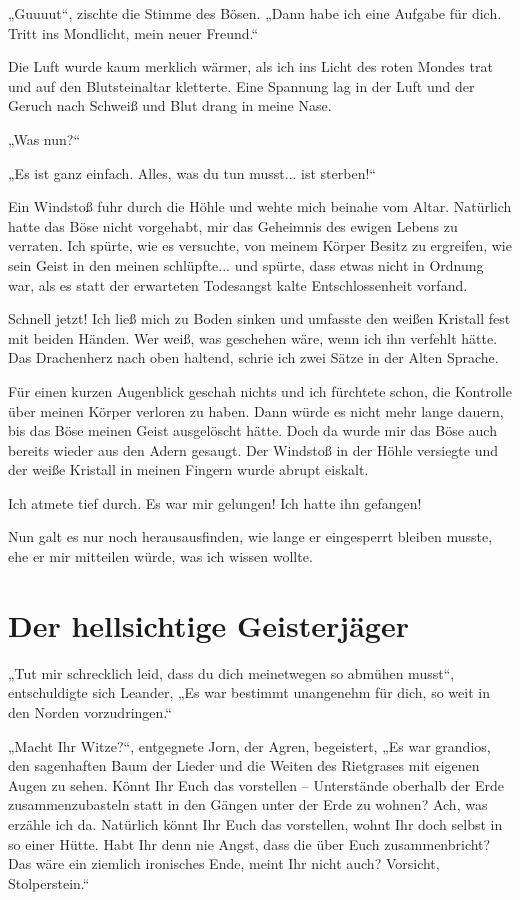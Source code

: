 „Guuuut“, zischte die Stimme des Bösen. „Dann habe ich eine Aufgabe für dich. Tritt ins Mondlicht, mein neuer Freund.“

Die Luft wurde kaum merklich wärmer, als ich ins Licht des roten Mondes trat und auf den Blutsteinaltar kletterte. Eine Spannung lag in der Luft und der Geruch nach Schweiß und Blut drang in meine Nase.

„Was nun?“

„Es ist ganz einfach. Alles, was du tun musst... ist sterben!“

Ein Windstoß fuhr durch die Höhle und wehte mich beinahe vom Altar. Natürlich hatte das Böse nicht vorgehabt, mir das Geheimnis des ewigen Lebens zu verraten. Ich spürte, wie es versuchte, von meinem Körper Besitz zu ergreifen, wie sein Geist in den meinen schlüpfte... und spürte, dass etwas nicht in Ordnung war, als es statt der erwarteten Todesangst kalte Entschlossenheit vorfand.

Schnell jetzt! Ich ließ mich zu Boden sinken und umfasste den weißen Kristall fest mit beiden Händen. Wer weiß, was geschehen wäre, wenn ich ihn verfehlt hätte. Das Drachenherz nach oben haltend, schrie ich zwei Sätze in der Alten Sprache.

Für einen kurzen Augenblick geschah nichts und ich fürchtete schon, die Kontrolle über meinen Körper verloren zu haben. Dann würde es nicht mehr lange dauern, bis das Böse meinen Geist ausgelöscht hätte. Doch da wurde mir das Böse auch bereits wieder aus den Adern gesaugt. Der Windstoß in der Höhle versiegte und der weiße Kristall in meinen Fingern wurde abrupt eiskalt.

Ich atmete tief durch. Es war mir gelungen! Ich hatte ihn gefangen!

Nun galt es nur noch herausausfinden, wie lange er eingesperrt bleiben musste, ehe er mir mitteilen würde, was ich wissen wollte.





\newpage
\section{Der hellsichtige Geisterjäger}

„Tut mir schrecklich leid, dass du dich meinetwegen so abmühen musst“, entschuldigte sich Leander, „Es war bestimmt unangenehm für dich, so weit in den Norden vorzudringen.“

„Macht Ihr Witze?“, entgegnete Jorn, der Agren, begeistert, „Es war grandios, den sagenhaften Baum der Lieder und die Weiten des Rietgrases mit eigenen Augen zu sehen. Könnt Ihr Euch das vorstellen – Unterstände oberhalb der Erde zusammenzubasteln statt in den Gängen unter der Erde zu wohnen? Ach, was erzähle ich da. Natürlich könnt Ihr Euch das vorstellen, wohnt Ihr doch selbst in so einer Hütte. Habt Ihr denn nie Angst, dass die über Euch zusammenbricht? Das wäre ein ziemlich ironisches Ende, meint Ihr nicht auch? Vorsicht, Stolperstein.“

